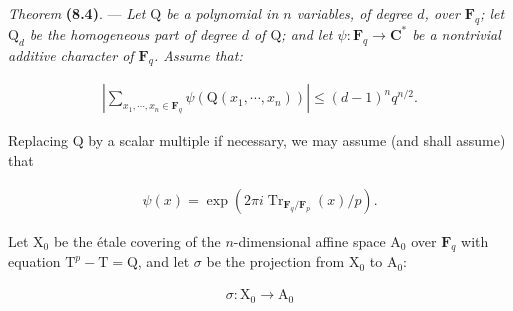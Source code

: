 \documentclass[10pt,leqno]{article}
\begin{document}
\noindent \emph{Theorem} \textbf{(8.4)}. — {\itshape Let \(\mathrm{Q}\) be a polynomial in \(n\) variables, of degree \(d\), over \(\mathbf{F}_{q}\); let \(\mathrm{Q}_{d}\) be the homogeneous part of degree \(d\) of \(\mathrm{Q}\); and let \(\psi  : \mathbf{F}_{q} \longrightarrow  \mathbf{C}^{*}\) be a nontrivial additive character of \(\mathbf{F}_{q}\). Assume that:}\par

\par

\clearpage

\label{physical-32}\par\smallskip

\par

\begin{equation*}\begin{gathered}|\sum _{x_{1},\cdots ,x_{n} \in  \mathbf{F}_{q}} \psi (\mathrm{Q}(x_{1},\cdots ,x_{n}))| \leq  (d-1)^{n} q^{n/2}.\end{gathered}\end{equation*}

\noindent Replacing \(\mathrm{Q}\) by a scalar multiple if necessary, we may assume (and shall assume) that\par

\begin{equation*}\begin{gathered}\psi (x) = \operatorname{exp}(2\pi i \operatorname{Tr}_{\mathbf{F}_{q}/\mathbf{F}_{p}}(x)/p).\end{gathered}\tag{8.4.1}\end{equation*}

\noindent Let \(\mathrm{X}_{0}\) be the étale covering of the \(n\)-dimensional affine space \(\mathrm{A}_{0}\) over \(\mathbf{F}_{q}\) with equation \(\mathrm{T}^{p} - \mathrm{T} = \mathrm{Q}\), and let \(\sigma \) be the projection from \(\mathrm{X}_{0}\) to \(\mathrm{A}_{0}\):\par

\begin{equation*}\begin{gathered}\sigma  : \mathrm{X}_{0} \longrightarrow  \mathrm{A}_{0}\end{gathered}\end{equation*}
\end{document}
